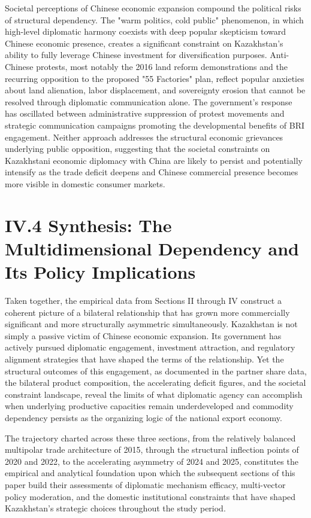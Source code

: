 \documentclass[12pt]{article}
\begin{document}
Societal perceptions of Chinese economic expansion compound the political risks of structural dependency. The "warm politics, cold public" phenomenon, in which high-level diplomatic harmony coexists with deep popular skepticism toward Chinese economic presence, creates a significant constraint on Kazakhstan's ability to fully leverage Chinese investment for diversification purposes. Anti-Chinese protests, most notably the 2016 land reform demonstrations and the recurring opposition to the proposed "55 Factories" plan, reflect popular anxieties about land alienation, labor displacement, and sovereignty erosion that cannot be resolved through diplomatic communication alone. The government's response has oscillated between administrative suppression of protest movements and strategic communication campaigns promoting the developmental benefits of BRI engagement. Neither approach addresses the structural economic grievances underlying public opposition, suggesting that the societal constraints on Kazakhstani economic diplomacy with China are likely to persist and potentially intensify as the trade deficit deepens and Chinese commercial presence becomes more visible in domestic consumer markets.\par

\section{IV.4 Synthesis: The Multidimensional Dependency and Its Policy Implications}

Taken together, the empirical data from Sections II through IV construct a coherent picture of a bilateral relationship that has grown more commercially significant and more structurally asymmetric simultaneously. Kazakhstan is not simply a passive victim of Chinese economic expansion. Its government has actively pursued diplomatic engagement, investment attraction, and regulatory alignment strategies that have shaped the terms of the relationship. Yet the structural outcomes of this engagement, as documented in the partner share data, the bilateral product composition, the accelerating deficit figures, and the societal constraint landscape, reveal the limits of what diplomatic agency can accomplish when underlying productive capacities remain underdeveloped and commodity dependency persists as the organizing logic of the national export economy.\par

The trajectory charted across these three sections, from the relatively balanced multipolar trade architecture of 2015, through the structural inflection points of 2020 and 2022, to the accelerating asymmetry of 2024 and 2025, constitutes the empirical and analytical foundation upon which the subsequent sections of this paper build their assessments of diplomatic mechanism efficacy, multi-vector policy moderation, and the domestic institutional constraints that have shaped Kazakhstan's strategic choices throughout the study period.\par
\end{document}
